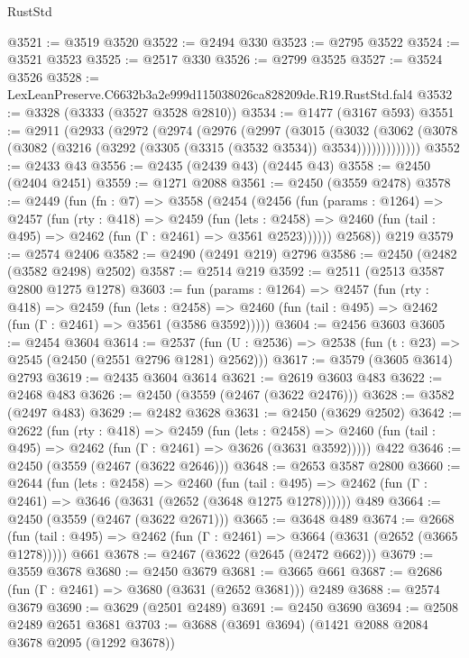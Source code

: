\begin{lexlean}{RustStd}
\begin{coremodule}
@3521 := @3519 @3520
@3522 := @2494 @330
@3523 := @2795 @3522
@3524 := @3521 @3523
@3525 := @2517 @330
@3526 := @2799 @3525
@3527 := @3524 @3526
@3528 := LexLeanPreserve.C6632b3a2e999d115038026ca828209de.R19.RustStd.fal4
@3532 := @3328 (@3333 (@3527 @3528 @2810))
@3534 := @1477 (@3167 @593)
@3551 := @2911
    (@2933
      (@2972
        (@2974
          (@2976
            (@2997
              (@3015
                (@3032
                  (@3062 (@3078 (@3082 (@3216 (@3292 (@3305 (@3315 (@3532 @3534)) @3534)))))))))))))
@3552 := @2433 @43
@3556 := @2435 (@2439 @43) (@2445 @43)
@3558 := @2450 (@2404 @2451)
@3559 := @1271 @2088
@3561 := @2450 (@3559 @2478)
@3578 := @2449
    (fun (fn : @7) =>
    @3558
      (@2454
        (@2456
          (fun (params : @1264) =>
          @2457
            (fun (rty : @418) =>
            @2459
              (fun (lets : @2458) =>
              @2460 (fun (tail : @495) => @2462 (fun (Γ : @2461) => @3561 @2523))))))
        @2568))
    @219
@3579 := @2574 @2406
@3582 := @2490 (@2491 @219) @2796
@3586 := @2450 (@2482 (@3582 @2498) @2502)
@3587 := @2514 @219
@3592 := @2511 (@2513 @3587 @2800 @1275 @1278)
@3603 := fun (params : @1264) =>
  @2457
    (fun (rty : @418) =>
    @2459
      (fun (lets : @2458) =>
      @2460 (fun (tail : @495) => @2462 (fun (Γ : @2461) => @3561 (@3586 @3592)))))
@3604 := @2456 @3603
@3605 := @2454 @3604
@3614 := @2537 (fun (U : @2536) => @2538 (fun (t : @23) => @2545 (@2450 (@2551 @2796 @1281) @2562)))
@3617 := @3579 (@3605 @3614) @2793
@3619 := @2435 @3604 @3614
@3621 := @2619 @3603 @483
@3622 := @2468 @483
@3626 := @2450 (@3559 (@2467 (@3622 @2476)))
@3628 := @3582 (@2497 @483)
@3629 := @2482 @3628
@3631 := @2450 (@3629 @2502)
@3642 := @2622
    (fun (rty : @418) =>
    @2459
      (fun (lets : @2458) =>
      @2460 (fun (tail : @495) => @2462 (fun (Γ : @2461) => @3626 (@3631 @3592)))))
    @422
@3646 := @2450 (@3559 (@2467 (@3622 @2646)))
@3648 := @2653 @3587 @2800
@3660 := @2644
    (fun (lets : @2458) =>
    @2460
      (fun (tail : @495) => @2462 (fun (Γ : @2461) => @3646 (@3631 (@2652 (@3648 @1275 @1278))))))
    @489
@3664 := @2450 (@3559 (@2467 (@3622 @2671)))
@3665 := @3648 @489
@3674 := @2668
    (fun (tail : @495) => @2462 (fun (Γ : @2461) => @3664 (@3631 (@2652 (@3665 @1278)))))
    @661
@3678 := @2467 (@3622 (@2645 (@2472 @662)))
@3679 := @3559 @3678
@3680 := @2450 @3679
@3681 := @3665 @661
@3687 := @2686 (fun (Γ : @2461) => @3680 (@3631 (@2652 @3681))) @2489
@3688 := @2574 @3679
@3690 := @3629 (@2501 @2489)
@3691 := @2450 @3690
@3694 := @2508 @2489 @2651 @3681
@3703 := @3688 (@3691 @3694) (@1421 @2088 @2084 @3678 @2095 (@1292 @3678))

\end{coremodule}
\end{lexlean}
